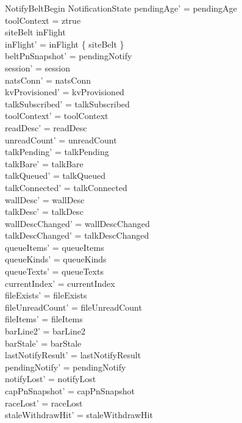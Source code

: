 \documentclass[a4paper,10pt,fleqn]{article}
\begin{document}
\begin{schema}{NotifyBeltBegin}
  \Delta NotificationState
  \where
  pendingAge' = pendingAge \\
  toolContext = ztrue \\
  siteBelt \notin inFlight \\
  inFlight' = inFlight \cup \{ siteBelt \} \\
  beltPnSnapshot' = pendingNotify \\
  session' = session \\
  natsConn' = natsConn \\
  kvProvisioned' = kvProvisioned \\
  talkSubscribed' = talkSubscribed \\
  toolContext' = toolContext \\
  readDesc' = readDesc \\
  unreadCount' = unreadCount \\
  talkPending' = talkPending \\
  talkBare' = talkBare \\
  talkQueued' = talkQueued \\
  talkConnected' = talkConnected \\
  wallDesc' = wallDesc \\
  talkDesc' = talkDesc \\
  wallDescChanged' = wallDescChanged \\
  talkDescChanged' = talkDescChanged \\
  queueItems' = queueItems \\
  queueKinds' = queueKinds \\
  queueTexts' = queueTexts \\
  currentIndex' = currentIndex \\
  fileExists' = fileExists \\
  fileUnreadCount' = fileUnreadCount \\
  fileItems' = fileItems \\
  barLine2' = barLine2 \\
  barStale' = barStale \\
  lastNotifyResult' = lastNotifyResult \\
  pendingNotify' = pendingNotify \\
  notifyLost' = notifyLost \\
  capPnSnapshot' = capPnSnapshot \\
  raceLost' = raceLost \\
  staleWithdrawHit' = staleWithdrawHit \\

\end{schema}
\end{document}
